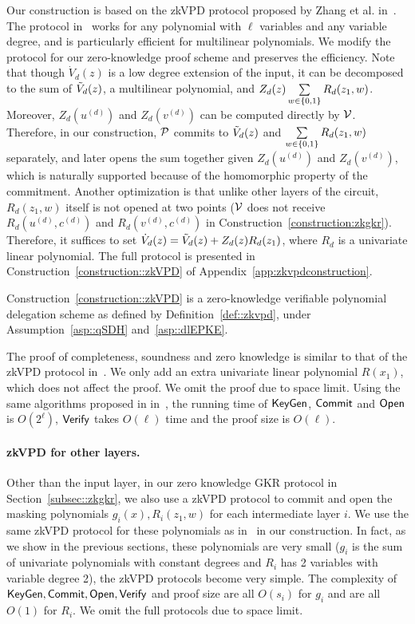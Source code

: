 Our construction is based on the zkVPD protocol proposed by Zhang et al. in~\cite{zkvpd}. The protocol in~\cite{zkvpd} works for any polynomial with $\ell$ variables and any variable degree, and is particularly efficient for multilinear polynomials. We modify the protocol for our zero-knowledge proof scheme and preserves the efficiency. Note that though $\dot{V}_d(z)$ is a low degree extension of the input, it can be decomposed to the sum of $\tV_d(z)$, a multilinear polynomial, and $Z_d(z)\sum\limits_{w \in\binary} R_d(z_1,w)$. Moreover, $Z_d(u^{(d)})$ and $Z_d(v^{(d)})$ can be computed directly by $\V$. Therefore, in our construction, $\P$ commits to $\tV_d(z)$ and $\sum\limits_{w \in\binary} R_d(z_1,w)$ separately, and later opens the sum together given $Z_d(u^{(d)})$ and $Z_d(v^{(d)})$, which is naturally supported because of the homomorphic property of the commitment. Another optimization is that unlike other layers of the circuit, $R_d(z_1,w)$ itself is not opened at two points ($\V$ does not receive $R_d(u^{(d)},c^{(d)})$ and $R_d(v^{(d)},c^{(d)})$ in Construction~\ref{construction:zkgkr}). Therefore, it suffices to set $\dot{V}_d(z)=\tV_d(z)+Z_d(z)R_d(z_1)$, where $R_d$ is a univariate linear polynomial. The full protocol is presented in Construction~\ref{construction::zkVPD} of Appendix~\ref{app:zkvpdconstruction}.




\begin{theorem}\label{thm:zkvpd}
	Construction~\ref{construction::zkVPD} is a zero-knowledge verifiable polynomial delegation scheme as defined by Definition~\ref{def::zkvpd}, under Assumption~\ref{asp::qSDH} and~\ref{asp::dlEPKE}.
\end{theorem}

The proof of completeness, soundness and zero knowledge is similar to that of the zkVPD protocol in~\cite{zkvpd}. We only add an extra univariate linear polynomial $R(x_1)$, which does not affect the proof. We omit the proof due to space limit. Using the same algorithms proposed in in~\cite{vram,zkvpd}, the running time of $\KeyGen$, $\Commit$ and $\Open$ is $O(2^\ell)$, $\Verify$ takes $O(\ell)$ time and the proof size is $O(\ell)$.




\paragraph{zkVPD for other layers.}
Other than the input layer, in our zero knowledge GKR protocol in Section~\ref{subsec::zkgkr}, we also use a zkVPD protocol to commit and open the masking polynomials $g_i(x), R_i(z_1, w)$ for each intermediate layer $i$. We use the same zkVPD protocol for these polynomials as in~\cite{zkvpd} in our construction. In fact, as we show in the previous sections, these polynomials are very small ($g_i$ is the sum of univariate polynomials with constant degrees and $R_i$ has 2 variables with variable degree 2), the zkVPD protocols become very simple. The complexity of $\KeyGen, \Commit, \Open, \Verify$ and proof size are all $O(s_i)$ for $g_i$ and are all $O(1)$ for $R_i$. We omit the full protocols due to space limit.


